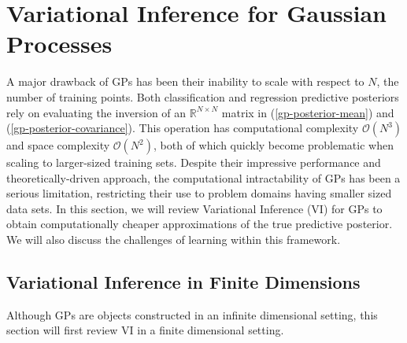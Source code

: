 \documentclass{article}
\numberwithin{equation}{section}
\begin{document}
\section{Variational Inference for Gaussian Processes}\label{section:vi-gp}
A major drawback of GPs has been their inability to scale with respect to $N$, the number of training points.
Both classification and regression predictive posteriors rely on evaluating the inversion of an $\mathbb{R}^{N \times N}$ matrix in (\ref{gp-posterior-mean}) and (\ref{gp-posterior-covariance}).
This operation has computational complexity $\mathcal{O}(N^3)$ and space complexity $\mathcal{O}(N^2)$, both of which quickly become problematic when scaling to larger-sized training sets.
Despite their impressive performance and theoretically-driven approach, the computational intractability of GPs has been a serious limitation, restricting their use to problem domains having smaller sized data sets.
In this section, we will review Variational Inference (VI) for GPs to obtain computationally cheaper approximations of the true predictive posterior.
We will also discuss the challenges of learning within this framework.

\subsection{Variational Inference in Finite Dimensions}\label{section:vi-in-finite-dimensions}
Although GPs are objects constructed in an infinite dimensional setting, this section will first review VI in a finite dimensional setting.
\end{document}
